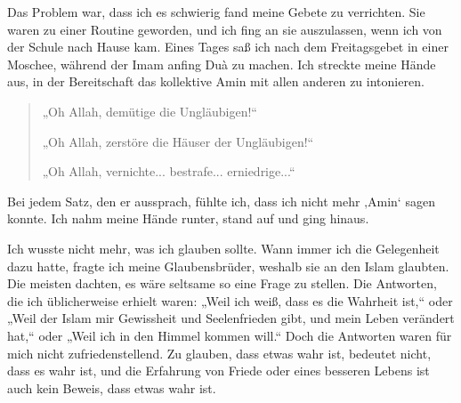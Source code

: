 \documentclass[12pt]{memoir}
\begin{document}
Das Problem war, dass ich es schwierig fand meine Gebete zu verrichten.
Sie waren zu einer Routine geworden,
und ich fing an sie auszulassen,
wenn ich von der Schule nach Hause kam.
Eines Tages saß ich nach dem Freitagsgebet in einer Moschee,
während der Imam anfing Du\`a zu machen.
Ich streckte meine Hände aus,
in der Bereitschaft das kollektive Amin mit allen anderen zu intonieren.

\begin{quote}
„Oh Allah, demütige die Ungläubigen!“

„Oh Allah, zerstöre die Häuser der Ungläubigen!“

„Oh Allah, vernichte... bestrafe... erniedrige...“
\end{quote}

Bei jedem Satz, den er aussprach,
fühlte ich, dass ich nicht mehr ‚Amin‘ sagen konnte.
Ich nahm meine Hände runter, stand auf und ging hinaus.

Ich wusste nicht mehr, was ich glauben sollte.
Wann immer ich die Gelegenheit dazu hatte,
fragte ich meine Glaubensbrüder,
weshalb sie an den Islam glaubten.
Die meisten dachten, es wäre seltsame so eine Frage zu stellen.
Die Antworten, die ich üblicherweise erhielt waren:
„Weil ich weiß, dass es die Wahrheit ist,“ oder
„Weil der Islam mir Gewissheit und Seelenfrieden gibt,
und mein Leben verändert hat,“ oder
„Weil ich in den Himmel kommen will.“
Doch die Antworten waren für mich nicht zufriedenstellend.
Zu glauben, dass etwas wahr ist, bedeutet nicht, dass es wahr ist,
und die Erfahrung von Friede oder eines besseren Lebens ist auch kein Beweis,
dass etwas wahr ist.
\end{document}
